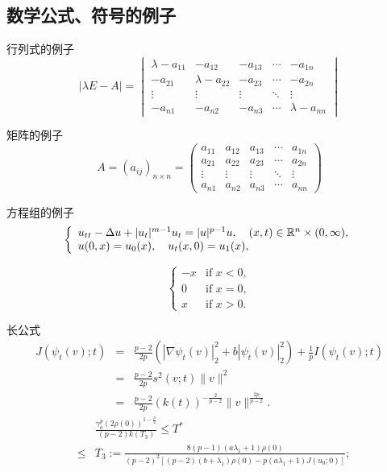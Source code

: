 \documentclass[UTF8,oneside,12pt]{article}
\theoremstyle{DingLi}
\numberwithin{equation}{section}
\def\l{\lambda}\def\L{\Lambda}
\begin{document}
\subsection{数学公式、符号的例子}

行列式的例子
\begin{equation*}
  |\lambda E- A|=
  \begin{vmatrix}
   \lambda-a_{11} & -a_{12} & -a_{13}&\cdots &-a_{1n} \\
    -a_{21} & \lambda-a_{22} & -a_{23} &\cdots & -a_{2n}\\
    \vdots & \vdots & \vdots&\ddots&\vdots \\
    -a_{n1} & -a_{n2} & -a_{n3} &\cdots& \lambda -a_{nn}
 \end{vmatrix}
\end{equation*}

矩阵的例子
\begin{equation*}
A=(a_{ij})_{n\times n} =
\begin{pmatrix}
  a_{11} & a_{12} & a_{13} & \cdots & a_{1n}\\
  a_{21} & a_{22} & a_{23} &\cdots & a_{2n}\\
 \vdots & \vdots & \vdots & \ddots& \vdots\\
 a_{n1} & a_{n2} & a_{n3} &\cdots & a_{nn}
\end{pmatrix}
\end{equation*}

方程组的例子
\begin{equation*}
\left\{   %
    \begin{array}{l} %
      u_{tt}-\Delta u+|u_t|^{m-1}u_t=|u|^{p-1}u,\quad (x,t)\in \Bbb{R}^n\times (0,\infty),\\
      u(0,x)=u_0(x),\quad u_t(x,0)=u_1(x),
      \end{array}
\right.
\end{equation*}

\begin{equation*}
\left\{
   \begin{array}{rl} %
      -x & \text{if } x < 0,\\
       0 & \text{if } x = 0,\\
       x & \text{if } x > 0.
\end{array} 
\right.
\end{equation*}


长公式
\begin{eqnarray*}
J(\psi_t(v);t)&=&\frac{p-2}{2p}(|\nabla \psi_t(v)|_2^2+b|\psi_t(v)|_2^2)+\frac1p I(\psi_t(v);t) \\
                &=&\frac{p-2}{2p}s^2(v;t)\|v\|^2 \\
                &=&\frac{p-2}{2p}(k(t))^{-\frac{2}{p-2}}\|v\|^{\frac{2p}{p-2}}.
\end{eqnarray*}
\begin{eqnarray*}
  &       &\frac{\gamma_a^p\left(2\rho(0)\right)^{1-\frac{p}{2}}}{\left(p-2\right)k(T_3)}\leq T^* \\
  &\leq & T_3:= \frac{8(p-1)(a\l_1+1)\rho(0)}{(p-2)^2[(p-2)(b+\l_1)\rho(0)-p(a\l_1+1)J(u_0;0)]};
  \end{eqnarray*}
  
\end{document}
